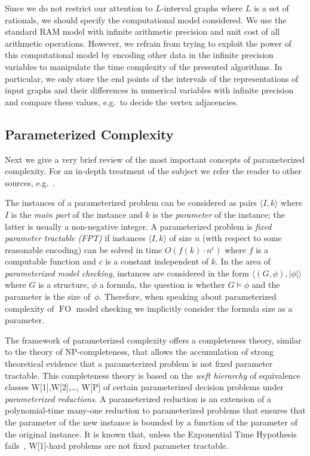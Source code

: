\documentclass{CSML}
\newcommand{\FO}{\ensuremath{\operatorname{FO}}\xspace}
\theoremstyle{plain}\newtheorem{claim}[thm]{Claim}
\begin{document}
Since we do not restrict our attention to $L$-interval graphs where $L$ is a set of rationals,
we should specify the computational model considered. We use the standard RAM model
with infinite arithmetic precision and unit cost of all arithmetic operations.
However, we refrain from trying to exploit the power of this computational model
by encoding other data in the infinite precision variables to manipulate the time complexity of the presented algorithms.
In particular,
we only store the end points of the intervals of the representations of input graphs and their differences
in numerical variables with infinite precision and compare these values, e.g.~to decide the vertex adjacencies.

\subsection{Parameterized Complexity}\label{section:pc}

Next we give a very brief review of the most important
concepts of parameterized complexity. For an in-depth treatment of the
subject we refer the reader to other sources, e.g.~\cite{df13}.

The instances of a parameterized problem can be considered as pairs
$\langle I,k\rangle$ where $I$ is the \emph{main part} of the instance and $k$ is
the \emph{parameter} of the instance; the latter is usually a
non-negative integer.  A parameterized problem is
\emph{fixed parameter tractable (FPT)} if instances $\langle I,k\rangle$ 
of size $n$ (with respect to some reasonable encoding) can be solved
in time $O(f(k)\cdot n^c)$ where $f$ is a computable function and $c$
is a constant independent of $k$.
In the area of {\em parameterized model checking}, instances are
considered in the form $\langle(G,\phi),|\phi|\rangle$
where $G$ is a structure, $\phi$ a formula, the question is whether
$G\models\phi$ and the parameter is the size of~$\phi$.
Therefore, when speaking about parameterized complexity
of \FO model checking we implicitly consider the formula size as a parameter.

The framework of parameterized complexity offers a
completeness theory, similar to the theory of NP-completeness, 
that allows the accumulation of strong theoretical
evidence that a parameterized problem is not fixed parameter
tractable.  This completeness theory is based on the \emph{weft
  hierarchy} of equivalence classes W[1],W[2],\dots, W[P] of
certain parameterized decision problems under \emph{parameterized
  reductions}. A parameterized reduction is an
extension of a polynomial-time many-one reduction 
to parameterized problems that ensures that the parameter of the new instance
is bounded by a function of the parameter of the original instance.
It is known that, unless the Exponential Time Hypothesis fails~\cite{ipz01},
W[1]-hard problems are not fixed parameter tractable.
\end{document}
